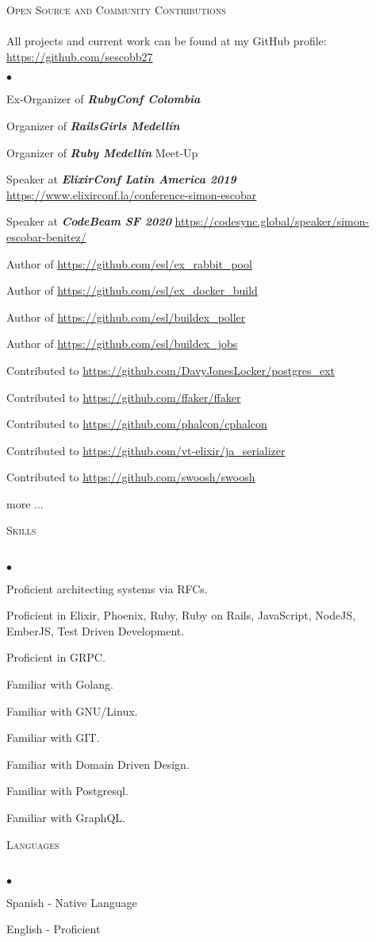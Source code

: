 \documentclass[a4paper]{article}
\newcommand{\lineunder}{\vspace*{-8pt} \\ \hspace*{-18pt} \hrulefill \\}
\newcommand{\header}[1]{{\hspace*{-15pt}\vspace*{6pt}
  \textsc{#1}} \vspace*{-6pt} \lineunder}
\newenvironment{achievements}{\begin{list}{$\bullet$}{\topsep 0pt \itemsep
  -2pt}}{\vspace*{4pt}\end{list}}
\newcommand{\emphasys}[1]{\textbf{\emph{#1}}}
\begin{document}
  \newpage

  \header{Open Source and Community Contributions}
  All projects and current work can be found at my GitHub profile: \url{https://github.com/sescobb27}
  \begin{achievements}
  \item{Ex-Organizer of \emphasys{RubyConf Colombia}}
  \item{Organizer of \emphasys{RailsGirls Medell\'in}}
  \item{Organizer of \emphasys{Ruby Medell\'in} Meet-Up}
  \item{Speaker at \emphasys{ElixirConf Latin America 2019} \url{https://www.elixirconf.la/conference-simon-escobar}}
  \item{Speaker at \emphasys{CodeBeam SF 2020} \url{https://codesync.global/speaker/simon-escobar-benitez/}}
  \item{Author of \url{https://github.com/esl/ex_rabbit_pool}}
  \item{Author of \url{https://github.com/esl/ex_docker_build}}
  \item{Author of \url{https://github.com/esl/buildex_poller}}
  \item{Author of \url{https://github.com/esl/buildex_jobs}}
  \item{Contributed to \url{https://github.com/DavyJonesLocker/postgres_ext}}
  \item{Contributed to \url{https://github.com/ffaker/ffaker}}
  \item{Contributed to \url{https://github.com/phalcon/cphalcon}}
  \item{Contributed to \url{https://github.com/vt-elixir/ja_serializer}}
  \item{Contributed to \url{https://github.com/swoosh/swoosh}}
  \item{more ...}
  \end{achievements}

  \header{Skills}
  \begin{achievements}
  \item {Proficient architecting systems via RFCs.}
  \item {Proficient in Elixir, Phoenix, Ruby, Ruby on Rails, JavaScript, NodeJS, EmberJS, Test Driven Development.}
  \item {Proficient in GRPC.}
  \item {Familiar with Golang.}
  \item {Familiar with GNU/Linux.}
  \item {Familiar with GIT.}
  \item {Familiar with Domain Driven Design.}
  \item {Familiar with Postgresql.}
  \item {Familiar with GraphQL.}
  \end{achievements}
  \header{Languages}
  \begin{achievements}
  \item{Spanish - Native Language}
  \item{English - Proficient}
  \end{achievements}
\end{document}
